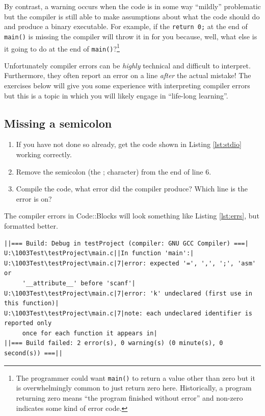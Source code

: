 \documentclass{lab}
\begin{document}
By contrast, a warning occurs when the code is in some way ``mildly'' problematic but the compiler is still able to make assumptions about what the code should do and produce a binary executable. For example, if the \texttt{return 0;} at the end of \texttt{main()} is missing the compiler will throw it in for you because, well, what else is it going to do at the end of \texttt{main()}?\footnote{The programmer could want \texttt{main()} to return a value other than zero but it is overwhelmingly common to just return zero here. Historically, a program returning zero means ``the program finished without error'' and non-zero indicates some kind of error code.}

Unfortunately compiler errors can be \textit{highly} technical and difficult to interpret. Furthermore, they often report an error on a line \textit{after} the actual mistake! The exercises below will give you some experience with interpreting compiler errors but this is a topic in which you will likely engage in ``life-long learning''.

\subsection{Missing a semicolon}

\begin{task}{}{}
\begin{enumerate}
	\item If you have not done so already, get the code shown in Listing \ref{lst:stdio} working correctly.
	\item Remove the semicolon (the ; character) from the end of line 6.
	\item Compile the code, what error did the compiler produce? Which line is the error is on?
\end{enumerate}
\end{task}
	
	The compiler errors in Code::Blocks will look something like Listing \ref{lst:errs}, but formatted better.
	
	\begin{lstlisting}[caption=The multiple errors produced by removing a \textit{single} semicolon.,label=lst:errs,basicstyle=\ttfamily\small,frame=single]
||=== Build: Debug in testProject (compiler: GNU GCC Compiler) ===|
U:\1003Test\testProject\main.c||In function 'main':|
U:\1003Test\testProject\main.c|7|error: expected '=', ',', ';', 'asm' or
     '__attribute__' before 'scanf'|
U:\1003Test\testProject\main.c|7|error: 'k' undeclared (first use in this function)|
U:\1003Test\testProject\main.c|7|note: each undeclared identifier is reported only
     once for each function it appears in|
||=== Build failed: 2 error(s), 0 warning(s) (0 minute(s), 0 second(s)) ===||
	\end{lstlisting}
\end{document}
